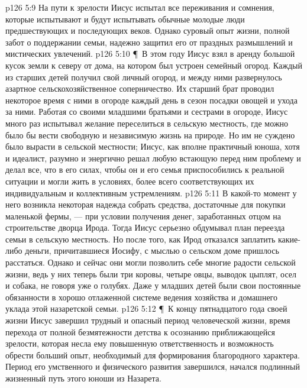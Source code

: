 \vs p126 5:9 На пути к зрелости Иисус испытал все переживания и сомнения, которые испытывают и будут испытывать обычные молодые люди предшествующих и последующих веков. Однако суровый опыт жизни, полной забот о поддержании семьи, надежно защитил его от праздных размышлений и мистических увлечений.
\vs p126 5:10 \P\ В этом году Иисус взял в аренду большой кусок земли к северу от дома, на котором был устроен семейный огород. Каждый из старших детей получил свой личный огород, и между ними развернулось азартное сельскохозяйственное соперничество. Их старший брат проводил некоторое время с ними в огороде каждый день в сезон посадки овощей и ухода за ними. Работая со своими младшими братьями и сестрами в огороде, Иисус много раз испытывал желание переселиться в сельскую местность, где можно было бы вести свободную и независимую жизнь на природе. Но им не суждено было вырасти в сельской местности; Иисус, как вполне практичный юноша, хотя и идеалист, разумно и энергично решал любую встающую перед ним проблему и делал все, что в его силах, чтобы он и его семья приспособились к реальной ситуации и могли жить в условиях, более всего соответствующих их индивидуальным и коллективным устремлениям.
\vs p126 5:11 В какой\hyp{}то момент у него возникла некоторая надежда собрать средства, достаточные для покупки маленькой фермы, --- при условии получения денег, заработанных отцом на строительстве дворца Ирода. Тогда Иисус серьезно обдумывал план переезда семьи в сельскую местность. Но после того, как Ирод отказался заплатить какие\hyp{}либо деньги, причитавшиеся Иосифу, с мыслью о сельском доме пришлось расстаться. Однако и сейчас они могли позволить себе многие радости сельской жизни, ведь у них теперь были три коровы, четыре овцы, выводок цыплят, осел и собака, не говоря уже о голубях. Даже у младших детей были свои постоянные обязанности в хорошо отлаженной системе ведения хозяйства и домашнего уклада этой назаретской семьи.
\vs p126 5:12 \P\ К концу пятнадцатого года своей жизни Иисус завершил трудный и опасный период человеческой жизни, время перехода от полной безмятежности детства к осознанию приближающейся зрелости, которая несла ему повышенную ответственность и возможность обрести больший опыт, необходимый для формирования благородного характера. Период его умственного и физического развития завершился, начался подлинный жизненный путь этого юноши из Назарета.
